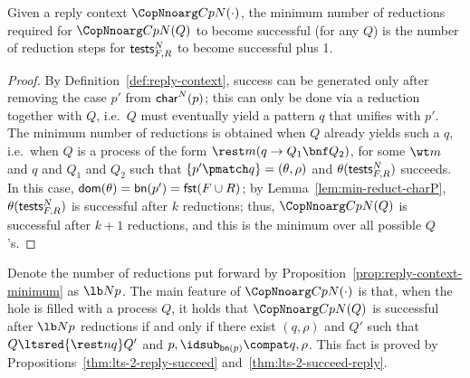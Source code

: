 \documentclass{LMCS}
\begin{document}
\begin{prop}
\label{prop:reply-context-minimum}
Given a reply context $\CopNnoarg C p N (\cdot)$, the minimum number of reductions required for $\CopNnoarg C p N (Q)$ 
to become successful (for any $Q$) is the number of reduction steps for ${\sf tests}^N_{F,R}$ to become successful plus 1.
\end{prop}
\begin{proof}
By Definition~\ref{def:reply-context}, success can be generated only after removing the case $p'$ from ${\sf char}^{N}(p)$;
this can only be done via a reduction together with $Q$, i.e.\ $Q$ must eventually yield a pattern $q$
that unifies with $p'$. The minimum number of reductions is obtained when $Q$ already yields such a $q$, i.e.\ when $Q$ is a 
process of the form $\rest m (q\to Q_1\bnf Q_2)$, for some $\wt m$ and $q$ and $Q_1$ and $Q_2$ such that $\{p'\pmatch q\}=(\theta,\rho)$ and $\theta({\sf tests}^N_{F,R})$ succeeds. In this case, 
${\sf dom}(\theta) = {\sf bn}(p') = {\sf fst}(F\cup R)$; 
by Lemma~\ref{lem:min-reduct-charP}, $\theta({\sf tests}^N_{F,R})$ is successful after
$k$ reductions; thus, $\CopNnoarg C p N (Q)$ is successful after $k+1$ reductions, and this is
the minimum over all possible $Q$'s.
\end{proof}

Denote the number of reductions put forward by Proposition~\ref{prop:reply-context-minimum} as $\lb N p$.
The main feature of $\CopNnoarg C p N (\cdot)$ is that, when the hole is filled with a process $Q$, it holds that
$\CopNnoarg C p N (Q)$ is successful after $\lb N p$ reductions if and only if
there exist $(q,\rho)$ and $Q'$ such that $Q\ltsred{\rest n q}Q'$ and $p,\idsub_{{\sf bn}(p)}\compat q,\rho$.
This fact is proved by Propositions~\ref{thm:lts-2-reply-succeed} and~\ref{thm:lts-2-succeed-reply}.
\end{document}
